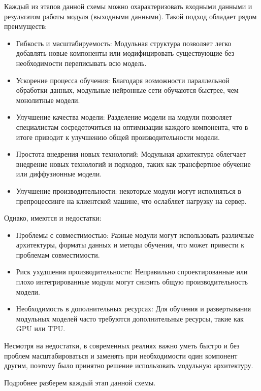 Каждый из этапов данной схемы можно охарактеризовать входными данными и результатом работы модуля (выходными данными).
Такой подход обладает рядом преимуществ:
\begin{itemize}
    \item Гибкость и масштабируемость: Модульная структура позволяет легко добавлять новые компоненты или модифицировать существующие без необходимости переписывать всю модель.
    \item Ускорение процесса обучения: Благодаря возможности параллельной обработки данных, модульные нейронные сети обучаются быстрее, чем монолитные модели.
    \item Улучшение качества модели: Разделение модели на модули позволяет специалистам сосредоточиться на оптимизации каждого компонента, что в итоге приводит к улучшению общей производительности модели.
    \item Простота внедрения новых технологий: Модульная архитектура облегчает внедрение новых технологий и подходов, таких как трансфертное обучение или диффузионные модели.
    \item Улучшение производительности: некоторые модули могут исполняться в препроцессинге на клиентской машине, что ослабляет нагрузку на сервер.
\end{itemize}
Однако, имеются и недостатки:
\begin{itemize}
    \item Проблемы с совместимостью: Разные модули могут использовать различные архитектуры, форматы данных и методы обучения, что может привести к проблемам совместимости.
    \item Риск ухудшения производительности: Неправильно спроектированные или плохо интегрированные модули могут снизить общую производительность модели.
    \item Необходимость в дополнительных ресурсах: Для обучения и развертывания модульных моделей часто требуются дополнительные ресурсы, такие как GPU или TPU.
\end{itemize}

Несмотря на недостатки, в современных реалиях важно уметь быстро и без проблем масштабироваться и заменять при необходимости один компонент другим, поэтому было принятно решение использовать модульную архитектуру.

Подробнее разберем каждый этап данной схемы.